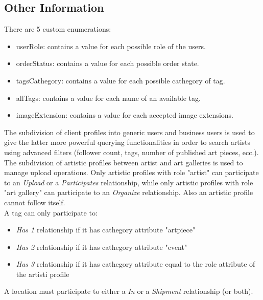 \subsection{Other Information}


There are 5 custom enumerations:
\begin{itemize}
    \item userRole: contains a value for each possible role of the users.
    \item orderStatus: contains a value for each possible order state.
    \item tagsCathegory: contains a value for each possible cathegory of tag.
    \item allTags: contains a value for each name of an available tag.
    \item imageExtension: contains a value for each accepted image extensions.
\end{itemize}
The subdivision of client profiles into generic users and business users is used to give the latter more powerful querying
functionalities in order to search artists using advanced filters (follower count, tags, number of published art pieces, ecc.).\\
The subdivision of artistic profiles between artist and art galleries is used to manage upload operations. Only artistic 
profiles with role "artist" can participate to an \textit{Upload} or a \textit{Participates} relationship, while only artistic profiles with role
"art gallery" can participate to an \textit{Organize} relationship. Also an artistic profile cannot follow itself.\\
A tag can only participate to:
\begin{itemize}
    \item \textit{Has 1} relationship if it has cathegory attribute "artpiece"
    \item \textit{Has 2} relationship if it has cathegory attribute "event"
    \item \textit{Has 3} relationship if it has cathegory attribute equal to the role attribute of the artisti profile
\end{itemize}
A location must participate to either a \textit{In} or a \textit{Shipment} relationship (or both).\\